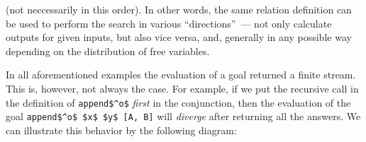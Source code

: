 (not neccessarily in this order). In other words, the same relation definition can be used to perform the search in various ``directions''~--- not only calculate
outputs for given inputs, but also vice versa, and, generally in any possible way depending on the distribution of free variables.

In all aforementioned examples the evaluation of a goal returned a finite stream. This is, however, not always the case. For example, if we put the recursive call in the definition of
\lstinline|append$^o$| \emph{first} in the conjunction, then the evaluation of the goal \lstinline|append$^o$ $x$ $y$ [A, B]| will \emph{diverge} after returning all the answers. We
can illustrate this behavior by the following diagram:


